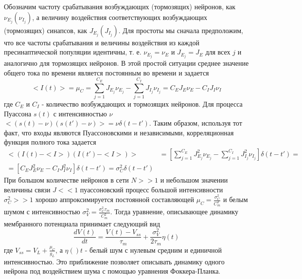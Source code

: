 Обозначим частоту срабатывания возбуждающих (тормозящих) нейронов, как $\nu_{E_j} (\nu_{I_j})$, а величину воздействия соответствующих возбуждающих (тормозящих) синапсов, как $J_{E_j} (J_{I_j})$. Для простоты мы сначала предположим, что все частоты срабатывания и величины воздействия из каждой пресинаптической популяции идентичны, т. е. $\nu_{E_j}=\nu_{E} \text{ и } J_{E_j}=J_{E}$ для всех $j$
и аналогично для тормозящих нейронов. В этой простой ситуации среднее значение общего тока по времени является постоянным во времени и задается
\begin{equation}
	<I(t)>=\mu_C=\sum_{j=1}^{C_E}J_{E_j}\nu_{E_j}-\sum_{j=1}^{C_I}J_{I_j}\nu_{I_j}=C_EJ_E\nu_{E}-C_IJ_I\nu_{I}
	\label{eq:5}
\end{equation}
где $C_E \text{ и } C_I$ - количество возбуждающих и тормозящих нейронов. Для процесса Пуассона $s(t)$ с интенсивностью $\nu$ $<(s(t)-\nu)(s(t')-\nu)>=\nu\delta(t-t')$. Таким образом,
используя тот факт, что входы являются Пуассоновскими и независимыми, корреляционная функция полного тока задается
\begin{equation}
\begin{split}
		<(I(t)-<I>)(I(t')-<I>)> &
	=\left[\sum_{j=1}^{C_E}J^2_{E_j}\nu_{E_j}-\sum_{j=1}^{C_I}J^2_{I_j}\nu_{I_j}\right]\delta(t-t')= \\
	=[C_EJ^2_E\nu_{E}-C_IJ^2_I\nu_{I}]\delta(t-t')=\sigma_C^2\delta(t-t')
	\label{eq:6}
\end{split}
\end{equation}
При большом количестве нейронов в сети $N>>1$ и небольшом значении величины связи $J<<1$ пуассоновский процесс большой интенсивности $\sigma_C^2>>1$ хорошо аппроксимируется постоянной составляющей $\displaystyle \mu_C=\frac{\sigma_C^2}{C_m^2}$ и белым шумом с интенсивностью $\displaystyle \sigma_V^2=\frac{\sigma_C^2\tau_m}{C_m^2}$. 
Тогда уравнение, описывающее динамику мембранного потенциала принимает следующий вид
\begin{equation}
	\frac{dV(t)}{dt}=\frac{V(t)-V_{ss}}{\tau_m}+\frac{\sigma_V^2}{2\tau_m}\eta(t)
	\label{eq:7}
\end{equation}
где $\displaystyle V_{ss}=V_L+\frac{\mu_C}{g_L}$, а $\eta()t$ - белый шум с нулевым средним и единичной интенсивностью. Это приближение позволяет описывать динамику одного нейрона под воздействием шума с помощью уравнения Фоккера-Планка.

